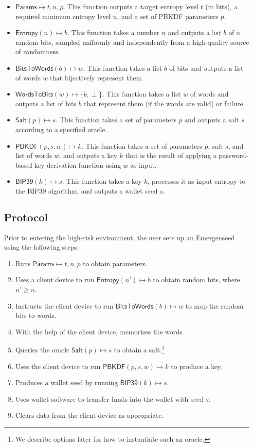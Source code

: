 \documentclass{article}
\begin{document}
\begin{itemize}
	\item $\mathsf{Params} \mapsto t, n, p$. This function outputs a target entropy level $t$ (in bits), a required minimum entropy level $n$, and a set of PBKDF parameters $p$.
	\item $\mathsf{Entropy}(n) \mapsto b$. This function takes a number $n$ and outputs a list $b$ of $n$ random bits, sampled uniformly and independently from a high-quality source of randomness.
	\item $\mathsf{BitsToWords}(b) \mapsto w$. This function takes a list $b$ of bits and outputs a list of words $w$ that bijectively represent them.
	\item $\mathsf{WordsToBits}(w) \mapsto \{b, \perp\}$. This function takes a list $w$ of words and outputs a list of bits $b$ that represent them (if the words are valid) or failure.
	\item $\mathsf{Salt}(p) \mapsto s$. This function takes a set of parameters $p$ and outputs a salt $s$ according to a specified oracle.
	\item $\mathsf{PBKDF}(p, s, w) \mapsto k$. This function takes a set of parameters $p$, salt $s$, and list of words $w$, and outputs a key $k$ that is the result of applying a password-based key derivation function using $w$ as input.
	\item $\mathsf{BIP39}(k) \mapsto s$. This function takes a key $k$, processes it as input entropy to the BIP39 algorithm, and outputs a wallet seed $s$.
\end{itemize}


\subsection{Protocol}

Prior to entering the high-risk environment, the user sets up an Emergenseed using the following steps:
\begin{enumerate}
	\item Runs $\mathsf{Params} \mapsto t, n, p$ to obtain parameters.
	\item Uses a client device to run $\mathsf{Entropy}(n') \mapsto b$ to obtain random bits, where $n' \geq n$.
	\item Instructs the client device to run $\mathsf{BitsToWords}(b) \mapsto w$ to map the random bits to words.
	\item With the help of the client device, memorizes the words.
	\item Queries the oracle $\mathsf{Salt}(p) \mapsto s$ to obtain a salt.\footnote{We describe options later for how to instantiate such an oracle.}
	\item Uses the client device to run $\mathsf{PBKDF}(p, s, w) \mapsto k$ to produce a key.
	\item Produces a wallet seed by running $\mathsf{BIP39}(k) \mapsto s$.
	\item Uses wallet software to transfer funds into the wallet with seed $s$.
	\item Clears data from the client device as appropriate.
\end{enumerate}
\end{document}
